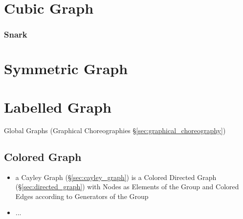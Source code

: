 \section{Cubic Graph}\label{sec:cubic_graph}

\subsubsection{Snark}\label{sec:snark}



\section{Symmetric Graph}\label{sec:symmetric_graph}

\section{Labelled Graph}\label{sec:labelled_graph}

\fist Global Graphs (Graphical Choreographies
\S\ref{sec:graphical_choreography})



\subsection{Colored Graph}\label{sec:colored_graph}

\begin{itemize}
  \item a Cayley Graph (\S\ref{sec:cayley_graph}) is a Colored Directed Graph
    (\S\ref{sec:directed_graph}) with Nodes as Elements of the Group and Colored
    Edges according to Generators of the Group
  \item ...
\end{itemize}



